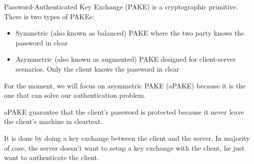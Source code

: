\documentclass[../report.tex]{subfiles}
\begin{document}





Password-Authenticated Key Exchange (PAKE) is a cryptographic primitive. There is two types of PAKEs: 

\begin{itemize}
 \item Symmetric (also known as balanced) PAKE where the two party knows the password in clear
 \item Asymmetric (also known as augmented) PAKE designed for client-server scenarios. Only the client knows the password in clear
\end{itemize}

For the moment, we will focus on asymmetric PAKE (aPAKE) because it is the one that can solve our authentication problem.

aPAKE guarantee that the client's password is protected because it never leave the client's machine in cleartext.


It is done by doing a key exchange between the client and the server.
In majority of case, the server doesn't want to setup a key exchange with the client, he just want to authenticate the client.
\end{document}
